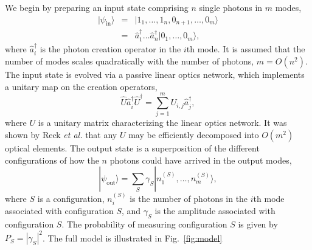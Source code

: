\documentclass[aps,pra,twocolumn,amsmath,amssymb,nofootinbib,superscriptaddress]{revtex4}
\newcommand{\ket}[1]{|#1\rangle}
\begin{document}
We begin by preparing an input state comprising $n$ single photons in $m$ modes,
\begin{eqnarray} \label{eq:input_state}
\ket{\psi_\mathrm{in}} &=& \ket{1_1,\dots,1_n,0_{n+1},\dots,0_m} \nonumber \\
&=& \hat{a}^\dag_1 \dots \hat{a}^\dag_n \ket{0_1,\dots,0_m},
\end{eqnarray}
where $\hat{a}^\dag_i$ is the photon creation operator in the $i$th mode. It is assumed that the number of modes scales quadratically with the number of photons, \mbox{$m=O(n^2)$}. The input state is evolved via a passive linear optics network, which implements a unitary map on the creation operators,
\begin{equation} \label{eq:Utransform}
\hat{U}\hat{a}_i^\dag\hat{U}^\dag = \sum_{j=1}^m U_{i,j} \hat{a}_j^\dag,
\end{equation} 
where $U$ is a unitary matrix characterizing the linear optics network. It was shown by Reck \emph{et al.} \cite{bib:Reck94} that any $U$ may be efficiently decomposed into $O(m^2)$ optical elements. The output state is a superposition of the different configurations of how the $n$ photons could have arrived in the output modes,
\begin{equation}
\ket{\psi_\mathrm{out}} = \sum_S \gamma_S \ket{n_1^{(S)},\dots,n_m^{(S)}},
\end{equation}
where $S$ is a configuration, $n_i^{(S)}$ is the number of photons in the $i$th mode associated with configuration $S$, and $\gamma_S$ is the amplitude associated with configuration $S$. The probability of measuring configuration $S$ is given by \mbox{$P_S = |\gamma_S|^2$}. The full model is illustrated in Fig.~\ref{fig:model}
\end{document}
